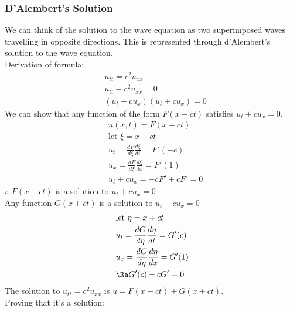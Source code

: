 \subsubsection{D'Alembert's Solution}
We can think of the solution to the wave equation as two superimposed waves travelling in opposite directions. This is represented through d'Alembert's solution to the wave equation.\\
Derivation of formula:
\begin{align*}
    &u_{tt}=c^2u_{xx}\\
    &u_{tt}-c^2u_{xx}=0\\
    &(u_t-cu_x)(u_t+cu_x)=0
\end{align*}
We can show that any function of the form $F(x-ct)$ satisfies $u_t+cu_x=0$.
\begin{align*}
    &u(x,t)=F(x-ct)\\
    &\text{let }\xi=x-ct\\
    &u_t=\frac{dF}{d\xi}\frac{d\xi}{dt}=F'(-c)\\
    &u_x=\frac{dF}{d\xi}\frac{d\xi}{dx}=F'(1)\\
    &u_t+cu_x=-cF'+cF'=0
\end{align*}
$\therefore$ $F(x-ct)$ is a solution to $u_t+cu_x=0$\\
Any function $G(x+ct)$ is a solution to $u_t-cu_x=0$
\begin{align*}
    &\text{let }\eta=x+ct\\
    &u_t=\frac{dG}{d\eta}\frac{d\eta}{dt}=G'(c)\\
    &u_x=\frac{dG}{d\eta}\frac{d\eta}{dx}=G'(1)\\
    &\Ra G'(c)-cG'=0
\end{align*}
The solution to $u_{tt}=c^2u_{xx}$ is $u=F(x-ct)+G(x+ct)$.\\
Proving that it's a solution:
